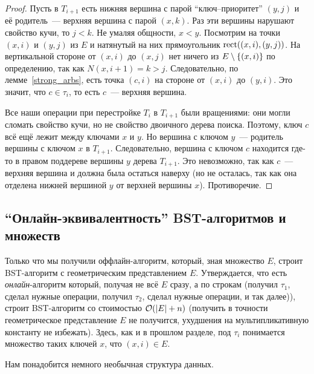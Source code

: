 \begin{proof}
	Пусть в $T_{i + 1}$ есть нижняя вершина с парой ``ключ--приоритет'' $(y, j)$ и её родитель~--- верхняя вершина с парой $(x, k)$. Раз эти вершины нарушают свойство кучи, то $j < k$.
	Не умаляя общности, $x < y$. Посмотрим на точки $(x, i)$ и $(y, j)$ из $E$ и натянутый на них прямоугольник $\operatorname{rect}((x, i), (y, j))$. На вертикальной стороне от $(x, i)$ до $(x, j)$ нет ничего из $E \setminus \lbrace(x, i)\rbrace$ по определению, так как $N(x, i + 1) = k > j$. Следовательно, по лемме~\ref{strong_arbs}, есть точка $(c, i)$ на
	стороне от $(x, i)$ до $(y, i)$. Это значит, что $c \in \tau_i$, то есть $c$~--- верхняя вершина.

	Все наши операции при перестройке $T_i$ в $T_{i + 1}$ были вращениями: они могли сломать свойство кучи, но не свойство двоичного дерева поиска. Поэтому, ключ $c$ всё ещё лежит между ключами $x$ и $y$. Но вершина с ключом $y$~--- родитель вершины с ключом $x$ в $T_{i + 1}$. Следовательно, вершина с ключом $c$ находится где-то в правом поддереве вершины $y$ дерева $T_{i + 1}$. Это невозможно, так как $c$~--- верхняя вершина и должна была остаться наверху (но не осталась, так как она отделена нижней вершиной $y$ от верхней вершины $x$). Противоречие.
\end{proof}

\subsection{``Онлайн-эквивалентность'' BST-алгоритмов и \arbs множеств}

Только что мы получили оффлайн-алгоритм, который, зная \arbs множество $E$, строит BST-алгоритм с геометрическим представлением $E$. Утверждается, что есть \emph{онлайн}-алгоритм который, получая не всё $E$ сразу, а по строкам (получил $\tau_1$, сделал нужные операции, получил $\tau_2$, сделал нужные операции, и так далее)), строит BST-алгоритм со стоимостью $\mathcal{O}(\lvert E\rvert + n)$
(получить в точности геометрическое представление $E$ не получится, ухудшения на мультипликативную константу не избежать). Здесь, как и в прошлом разделе, под $\tau_i$
понимается множество таких ключей $x$, что $(x, i) \in E$.

Нам понадобится немного необычная структура данных.

